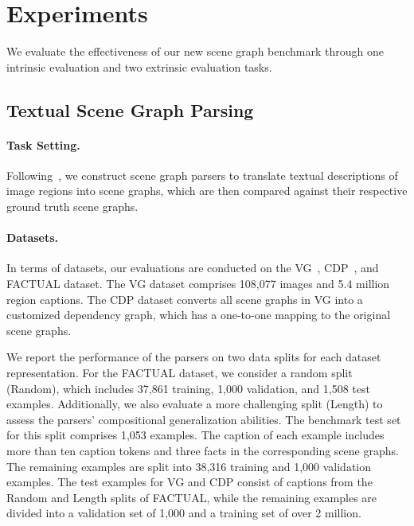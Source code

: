 \section{Experiments}
We evaluate the effectiveness of our new scene graph benchmark through one intrinsic evaluation and two extrinsic evaluation tasks.
\subsection{Textual Scene Graph Parsing}
\label{sec:text_parser}
\paragraph{Task Setting.}
Following~\citet{schuster2015generating,wang2018scene,choi-etal-2022-scene}, we construct scene graph parsers to translate textual descriptions of image regions into scene graphs, which are then compared against their respective ground truth scene graphs.
\paragraph{Datasets.} In terms of datasets, our evaluations are conducted on the VG~\cite{krishna2017visual}, CDP~\cite{wang2018scene}, and FACTUAL dataset. The VG dataset comprises 108,077 images and 5.4 million region captions. The CDP dataset converts all scene graphs in VG into a customized dependency graph, which has a one-to-one mapping to the original scene graphs.

We report the performance of the parsers on two data splits for each dataset representation. For the FACTUAL dataset, we consider a random split (Random), which includes 37,861 training, 1,000 validation, and 1,508 test examples. Additionally, we also evaluate a more challenging split (Length) to assess the parsers' compositional generalization abilities. The benchmark test set for this split comprises 1,053 examples. The caption of each example includes more than ten caption tokens and three facts in the corresponding scene graphs. The remaining examples are split into 38,316 training and 1,000 validation examples. The test examples for VG and CDP consist of captions from the Random and Length splits of FACTUAL, while the remaining examples are divided into a validation set of 1,000 and a training set of over 2 million.

